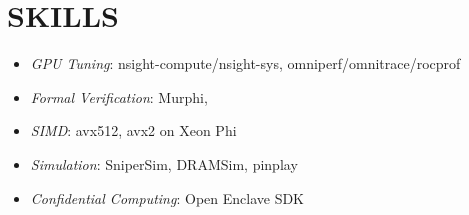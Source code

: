 \section{SKILLS}
    \vspace{-7pt}
    \resumeItemListStart
            \begin{itemize}
            \item[] \textit{GPU Tuning}: nsight-compute/nsight-sys, omniperf/omnitrace/rocprof
            \item[] \textit{Formal Verification}: Murphi, 
            \item[] \textit{SIMD}: avx512, avx2 on Xeon Phi
            \item[] \textit{Simulation}: SniperSim, DRAMSim, pinplay
            \item[] \textit{Confidential Computing}: Open Enclave SDK
            \end{itemize}

    \resumeItemListEnd